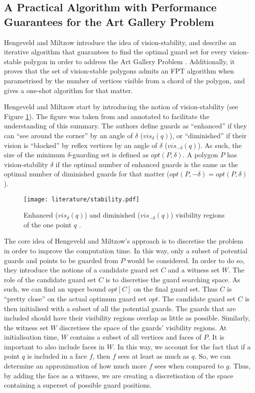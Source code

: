 \subsection[An Algorithm with Performance Guarantees]{A Practical Algorithm with Performance Guarantees for the Art Gallery Problem}
Hengeveld and Miltzow \cite{DBLP:journals/corr/abs-2007-06920} introduce the idea of vision-stability, and describe an iterative algorithm that guarantees to find the optimal guard set for every vision-stable polygon in order to address the Art Gallery Problem \cite{o1987art}. Additionally, it proves that the set of vision-stable polygons admits an FPT algorithm when parametrised by the number of vertices visible from a chord of the polygon, and gives a one-shot algorithm for that matter.

Hengeveld and Miltzow \cite{DBLP:journals/corr/abs-2007-06920} start by introducing the notion of vision-stability (see Figure \ref{fig:vis}). The figure was taken from \cite{DBLP:journals/corr/abs-2007-06920} and annotated to facilitate the understanding of this summary. The authors define guards as ``enhanced'' if they can ``see around the corner'' by an angle of $\delta$ ($vis_\delta(q)$), or ``diminished'' if their vision is ``blocked'' by reflex vertices by an angle of $\delta$ ($vis_{-\delta}(q)$). As such, the size of the minimum $\delta$-guarding set is defined as $opt(P, \delta)$. A polygon $P$ has vision-stability $\delta$ if the optimal number of enhanced guards is the same as the optimal number of diminished guards for that matter ($opt(P, -\delta) = opt(P, \delta)$). 

\begin{figure}[h!]
    \centering
    \texttt{[image: literature/stability.pdf]}
    \caption{Enhanced ($vis_\delta(q)$) and diminished ($vis_{-\delta}(q)$) visibility regions of the one point $q$ \cite{DBLP:journals/corr/abs-2007-06920}.}
    \label{fig:vis}
\end{figure}

The core idea of Hengeveld and Miltzow's approach is to discretise the problem in order to improve the computation time. In this way, only a subset of potential guards and points to be guarded from $P$ would be considered. In order to do so, they introduce the notions of a candidate guard set $C$ and a witness set $W$. The role of the candidate guard set $C$ is to discretise the guard searching space. As such, we can find an upper bound $opt[C]$ on the final guard set. Thus $C$ is ``pretty close'' on the actual optimum guard set $opt$. The candidate guard set $C$ is then initialised with a subset of all the potential guards. The guards that are included should have their visibility regions overlap as little as possible. Similarly, the witness set $W$ discretises the space of the guards' visibility regions. At initialisation time, $W$ contains a subset of all vertices and faces of $P$. It is important to also include faces in $W$. In this way, we account for the fact that if a point $q$ is included in a face $f$, then $f$ sees at least as much as $q$. So, we can determine an approximation of how much more $f$ sees when compared to $g$. Thus, by adding the face as a witness, we are creating a discretisation of the space containing a superset of possible guard positions.

